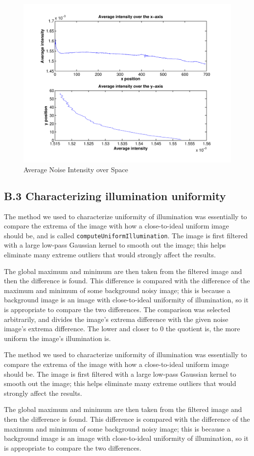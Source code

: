 \documentclass{article}
\begin{document}
\begin{figure}[t]
\centering
\includegraphics[width=0.45\linewidth]{figures/noise_over_space.pdf}
\caption{Average Noise Intensity over Space}
\label{fig:noise_intensity_space}
\end{figure}


\subsection*{B.3 Characterizing illumination uniformity}

The method we used to characterize uniformity of illumination was essentially to compare the extrema of the image with how a close-to-ideal uniform image should be, and is called \texttt{computeUniformIllumination}. The image is first filtered with a large low-pass Gaussian kernel to smooth out the image; this helps eliminate many extreme outliers that would strongly affect the results.

The global maximum and minimum are then taken from the filtered image and then the difference is found. This difference is compared with the difference of the maximum and minimum of some background noisy image; this is because a background image is an image with close-to-ideal uniformity of illumination, so it is appropriate to compare the two differences. The comparison was selected arbitrarily, and divides the image's extrema difference with the given noise image's extrema difference. The lower and closer to 0 the quotient is, the more uniform the image's illumination is.

The method we used to characterize uniformity of illumination was essentially to compare the extrema of the image with how a close-to-ideal uniform image should be. The image is first filtered with a large low-pass Gaussian kernel to smooth out the image; this helps eliminate many extreme outliers that would strongly affect the results.

The global maximum and minimum are then taken from the filtered image and then the difference is found.  This difference is compared with the difference of the maximum and minimum of some background noisy image; this is because a background image is an image with close-to-ideal uniformity of illumination, so it is appropriate to compare the two differences.
\end{document}
